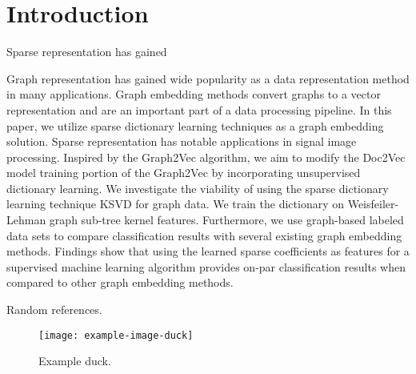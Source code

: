 \chapter{Introduction}\label{ch:introduction}

Sparse representation has gained 

Graph representation has gained wide popularity as a data representation method in many applications. Graph embedding methods convert graphs to a vector representation and are an important part of a data processing pipeline. In this paper, we utilize sparse dictionary learning techniques as a graph embedding solution. Sparse representation has notable applications in signal image processing. Inspired by the Graph2Vec algorithm, we aim to modify the Doc2Vec model training portion of the Graph2Vec by incorporating unsupervised dictionary learning. We investigate the viability of using the sparse dictionary learning technique KSVD for graph data. We train the dictionary on Weisfeiler-Lehman graph sub-tree kernel features. Furthermore, we use graph-based labeled data sets to compare classification results with several existing graph embedding methods. Findings show that using the learned sparse coefficients as features for a supervised machine learning algorithm provides on-par classification results when compared to other graph embedding methods. 

Random references\cite{Aharon2006}.

\begin{figure}[b!]
    \centering
    \texttt{[image: example-image-duck]}
    \caption[Example duck]{Example duck.}\label{fig:example}
\end{figure}
